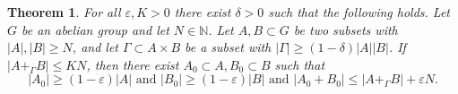 \documentclass[12pt,reqno]{amsart}
\newtheorem{theorem}{Theorem}
\theoremstyle{definition}
\renewcommand\leq{\leqslant}
\renewcommand\geq{\geqslant}
\begin{document}
\begin{theorem}\label{thm_shao}
For all $\varepsilon, K>0$ there exist $\delta>0$ such that the following holds. Let $G$ be an
abelian group and let $N \in \mathbb{N}$. Let $A,B \subset G$
be two subsets with $|A|, |B| \geq N$, and let $\Gamma \subset A \times B$ be a subset with $
|\Gamma|\geq (1-\delta)|A||B|$. If $|A+_{\Gamma}B| \leq KN$, then there
exist $A_0 \subset A, B_0 \subset B$ such that $$|A_0| \geq (1-\varepsilon)|A|
\text{ and } |B_0|\geq (1-\varepsilon)|B| \text{ and } |A_0+B_0| \leq |A+_{\Gamma}B|+\varepsilon N.$$
\end{theorem}



%
%
%
\end{document}
